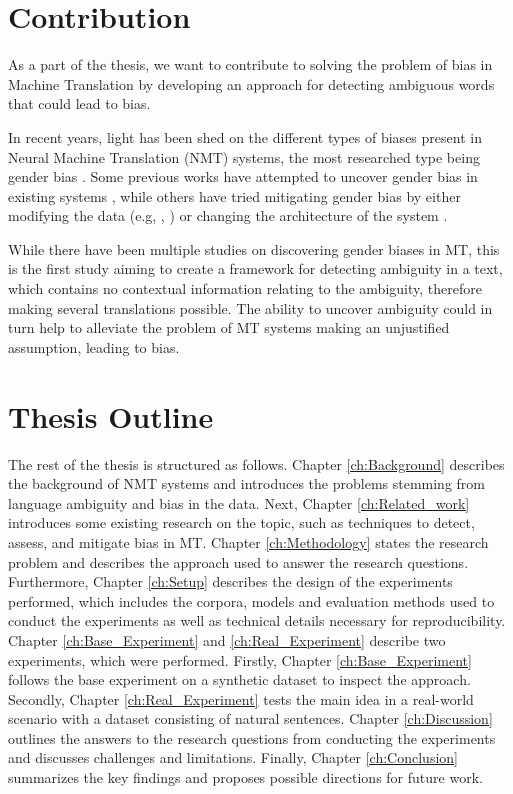 \section{Contribution}
\label{sec:Introduction:Contribution}

As a part of the thesis, we want to contribute to solving the problem of bias in Machine Translation by developing an approach for detecting ambiguous words that could lead to bias. 

In recent years, light has been shed on the different types of biases present in Neural Machine Translation (NMT) systems, the most researched type being gender bias \parencite{Savoldi_2021}. Some previous works have attempted to uncover gender bias in existing systems \parencite{Prates_2019}, while others have tried mitigating gender bias by either modifying the data (e.g, \citet{Escud_Font_2019}, \citet{Stanovsky_2019}) or changing the architecture of the system \parencite{Vanmassenhove_2018}. 

While there have been multiple studies on discovering gender biases in MT, this is the first study aiming to create a framework for detecting ambiguity in a text, which contains no contextual information relating to the ambiguity, therefore making several translations possible. The ability to uncover ambiguity could in turn help to alleviate the problem of MT systems making an unjustified assumption, leading to bias.


\section{Thesis Outline}
\label{sec:Introduction:Outline}
The rest of the thesis is structured as follows. 
Chapter \ref{ch:Background} describes the background of NMT systems and introduces the problems stemming from language ambiguity and bias in the data. 
Next, Chapter \ref{ch:Related_work} introduces some existing research on the topic, such as techniques to detect, assess, and mitigate bias in MT. 
Chapter \ref{ch:Methodology} states the research problem and describes the approach used to answer the research questions. 
Furthermore, Chapter \ref{ch:Setup} describes the design of the experiments performed, which includes the corpora, models and evaluation methods used to conduct the experiments as well as technical details necessary for reproducibility. 
Chapter \ref{ch:Base_Experiment} and \ref{ch:Real_Experiment} describe two experiments, which were performed. Firstly, Chapter \ref{ch:Base_Experiment} follows the base experiment on a synthetic dataset to inspect the approach. Secondly, Chapter \ref{ch:Real_Experiment} tests the main idea in a real-world scenario with a dataset consisting of natural sentences.
Chapter \ref{ch:Discussion} outlines the answers to the research questions from conducting the experiments and discusses challenges and limitations. 
Finally, Chapter \ref{ch:Conclusion} summarizes the key findings and proposes possible directions for future work.